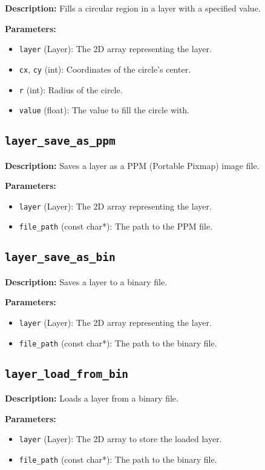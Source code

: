 \documentclass{article}
\begin{document}
\textbf{Description:} Fills a circular region in a layer with a specified value.

\textbf{Parameters:}
\begin{itemize}
    \item \texttt{layer} (Layer): The 2D array representing the layer.
    \item \texttt{cx}, \texttt{cy} (int): Coordinates of the circle's center.
    \item \texttt{r} (int): Radius of the circle.
    \item \texttt{value} (float): The value to fill the circle with.
\end{itemize}

\subsection*{\texttt{layer\_save\_as\_ppm}}

\textbf{Description:} Saves a layer as a PPM (Portable Pixmap) image file.

\textbf{Parameters:}
\begin{itemize}
    \item \texttt{layer} (Layer): The 2D array representing the layer.
    \item \texttt{file\_path} (const char*): The path to the PPM file.
\end{itemize}

\subsection*{\texttt{layer\_save\_as\_bin}}

\textbf{Description:} Saves a layer to a binary file.

\textbf{Parameters:}
\begin{itemize}
    \item \texttt{layer} (Layer): The 2D array representing the layer.
    \item \texttt{file\_path} (const char*): The path to the binary file.
\end{itemize}

\subsection*{\texttt{layer\_load\_from\_bin}}

\textbf{Description:} Loads a layer from a binary file.

\textbf{Parameters:}
\begin{itemize}
    \item \texttt{layer} (Layer): The 2D array to store the loaded layer.
    \item \texttt{file\_path} (const char*): The path to the binary file.
\end{itemize}
\end{document}
